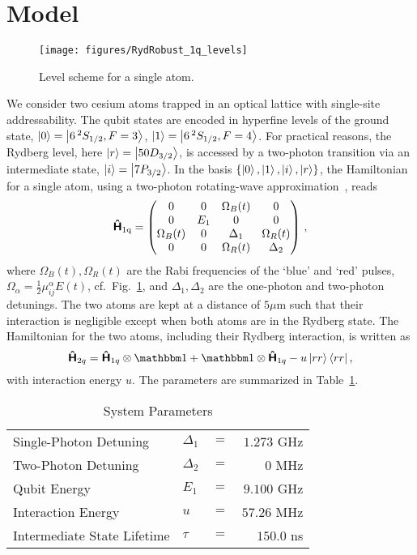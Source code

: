 \section{Model}
\label{sec:RydModel}

\begin{figure}[tb]
  \begin{center}
    \texttt{[image: figures/RydRobust\_1q\_levels]}
  \end{center}
  \caption{%
    Level scheme for a single atom.}
  \label{fig:RydRobust_1q_levels}
\end{figure}
We consider two cesium atoms trapped in an optical lattice with
single-site addressability.
The qubit states are encoded in hyperfine levels of the ground state,
$\Ket{0} =\Ket{6\,^2S_{1/2}, F=3}$,
$\Ket{1} =\Ket{6\,^2S_{1/2}, F=4}$.
For practical reasons, the Rydberg level, here
$\Ket{r}=\Ket{50D_{3/2}}$, is accessed by a two-photon transition via an
intermediate state, $\Ket{i}=\Ket{7P_{3/2}}$.
In the basis $\{\Ket{0},\Ket{1},\Ket{i},\Ket{r}\}$,
the Hamiltonian for a single atom, using a two-photon
rotating-wave approximation~\cite{ShoreBook11}, reads
\begin{equation}
  \label{eq:H_1q}
  \Op{H}_\text{1q} =
  \begin{pmatrix}
      0 & 0 & \Omega_B(t) & 0 \\
      0 & E_1 & 0 & 0 \\
      \Omega_B(t) & 0 & \Delta_1 & \Omega_R(t) \\
      0 & 0 & \Omega_R(t) & \Delta_2
  \end{pmatrix}\,,
\end{equation}
where $\Omega_B (t), \Omega_R (t)$ are the Rabi frequencies of the `blue' and
`red' pulses, $\Omega_\alpha=\frac{1}{2}\mu^\alpha_{ij}E(t)$, 
cf.\ Fig.~\ref{fig:RydRobust_1q_levels}, and $\Delta_1, \Delta_2$ are the
one-photon and two-photon detunings. 
The two atoms are kept at a distance of
$5 \mu$m such that their interaction is negligible except when both
atoms are in the Rydberg state.
The Hamiltonian for the two atoms, including their Rydberg
interaction, is written as
\begin{equation}
  \label{eq:2q_ham}
  \Op{H}_{2q} = \Op{H}_{1q} \otimes \openone + \openone \otimes \Op{H}_{1q}
  - u \Ket{rr}\langle rr|\,,
\end{equation}
with interaction energy $u$. The parameters are summarized in
Table~\ref{table:params}.
\begin{table}
  \begin{tabular}{llcr}
  Single-Photon Detuning      & $\Delta_1$ & $=$ & $1.273$ GHz \\
  Two-Photon Detuning         & $\Delta_2$ & $=$ & $0$ MHz \\
  Qubit Energy                & $E_1$      & $=$ & $9.100$ GHz \\
  Interaction Energy          & $u$        & $=$ & $57.26$ MHz \\
  Intermediate State Lifetime & $\tau$     & $=$ & $150.0$ ns
  \end{tabular}
  \caption{System Parameters}
  \label{table:params}
\end{table}
